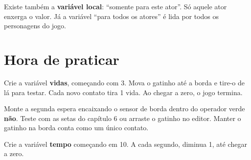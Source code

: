 \begin{curiosidade}
Existe também a \textbf{variável local}: ``somente para este ator''. Só aquele ator enxerga o valor. Já a variável ``para todos os atores'' é lida por todos os personagens do jogo.
\end{curiosidade}

\section{Hora de praticar}

\begin{exercicio}[Vidas]
Crie a variável \textbf{vidas}, começando com 3. Mova o gatinho até a borda e tire-o de lá para testar. Cada novo contato tira 1 vida. Ao chegar a zero, o jogo termina.
\end{exercicio}

\begin{solucao}
\begin{pilha}
\sbcend
\sbcend
{}
\end{pilha}
Monte a segunda espera encaixando o sensor de borda dentro do operador verde \textbf{não}. Teste com as setas do capítulo 6 ou arraste o gatinho no editor. Manter o gatinho na borda conta como um único contato.
\end{solucao}

\begin{exercicio}
Crie a variável \textbf{tempo} começando em 10. A cada segundo, diminua 1, até chegar a zero.
\end{exercicio}

\begin{solucao}
\begin{pilha}
\sbcend
{}
\end{pilha}
\end{solucao}


